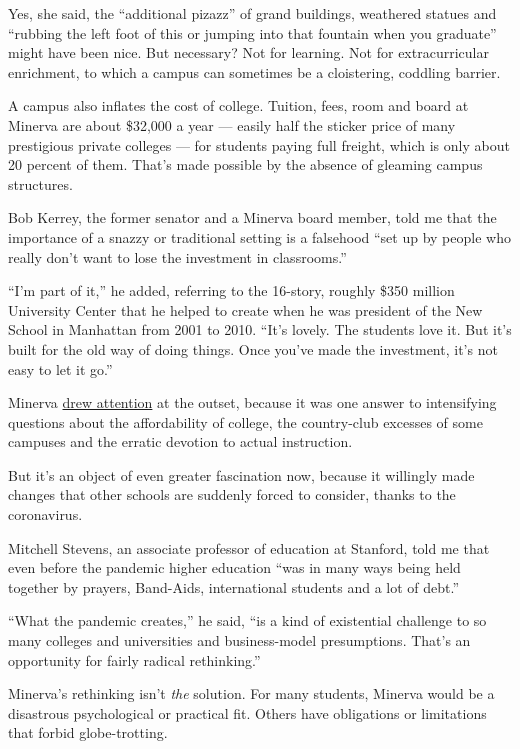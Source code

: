 Yes, she said, the ``additional pizazz'' of grand buildings, weathered
statues and ``rubbing the left foot of this or jumping into that
fountain when you graduate'' might have been nice. But necessary? Not
for learning. Not for extracurricular enrichment, to which a campus can
sometimes be a cloistering, coddling barrier.

A campus also inflates the cost of college. Tuition, fees, room and
board at Minerva are about \$32,000 a year --- easily half the sticker
price of many prestigious private colleges --- for students paying full
freight, which is only about 20 percent of them. That's made possible by
the absence of gleaming campus structures.

Bob Kerrey, the former senator and a Minerva board member, told me that
the importance of a snazzy or traditional setting is a falsehood ``set
up by people who really don't want to lose the investment in
classrooms.''

``I'm part of it,'' he added, referring to the 16-story, roughly \$350
million University Center that he helped to create when he was president
of the New School in Manhattan from 2001 to 2010. ``It's lovely. The
students love it. But it's built for the old way of doing things. Once
you've made the investment, it's not easy to let it go.''

Minerva
\href{https://www.theatlantic.com/magazine/archive/2014/09/the-future-of-college/375071/}{drew
attention} at the outset, because it was one answer to intensifying
questions about the affordability of college, the country-club excesses
of some campuses and the erratic devotion to actual instruction.

But it's an object of even greater fascination now, because it willingly
made changes that other schools are suddenly forced to consider, thanks
to the coronavirus.

Mitchell Stevens, an associate professor of education at Stanford, told
me that even before the pandemic higher education ``was in many ways
being held together by prayers, Band-Aids, international students and a
lot of debt.''

``What the pandemic creates,'' he said, ``is a kind of existential
challenge to so many colleges and universities and business-model
presumptions. That's an opportunity for fairly radical rethinking.''

Minerva's rethinking isn't \emph{the} solution. For many students,
Minerva would be a disastrous psychological or practical fit. Others
have obligations or limitations that forbid globe-trotting.

